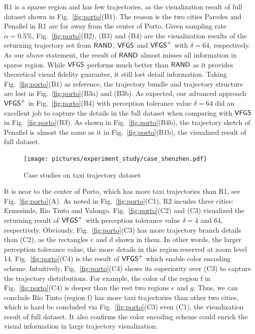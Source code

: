 R1 is a sparse region and has few trajectories, as the visualization result of full \pt{} dataset shown in Fig.~\ref{fig:porto}(B1).
The reason is the two cities Paredes and Penafiel in R1 are far away from the center of Porto.
Given sampling rate $\alpha=0.5\%$, Fig.~\ref{fig:porto}(B2), (B3) and (B4) are the visualization results of the returning trajectory set from $\mathsf{RAND}{}$, $\mathsf{VFGS}$ and $\mathsf{VFGS}^{+}$ with $\delta=64$, respectively.
As our above statement, the result of $\mathsf{RAND}$ almost misses all information in sparse region.
While $\mathsf{VFGS}$ performs much better than $\mathsf{RAND}$ as it provides theoretical visual fidelity guarantee, it still lost detail information.
Taking Fig.~\ref{fig:porto}(B1) as reference, the trajectory bundle and trajectory structure are lost in Fig.~\ref{fig:porto}(B3a) and (B3b).
As expected, our advanced approach $\mathsf{VFGS}^{+}$ in Fig.~\ref{fig:porto}(B4) with perception tolerance value $\delta=64$ did an excellent job to capture the details in the full dataset when comparing with $\mathsf{VFGS}$ in Fig.~\ref{fig:porto}(B3).
As shown in Fig.~\ref{fig:porto}(B4b), the trajectory sketch of Penafiel is almost the same as it in Fig.~\ref{fig:porto}(B1b), the visualized result of full dataset.


\begin{figure}[t]
	\centering
	\texttt{[image: pictures/experiment\_study/case\_shenzhen.pdf]}
	\vspace{-4mm}
	\caption{Case studies on \sz{} taxi trajectory dataset}
	\label{fig:shenzhen}
    \vspace{-3mm}
\end{figure}

 It is near to the center of Porto, which has more taxi trajectories than R1, see Fig.~\ref{fig:porto}(A).
As noted in Fig.~\ref{fig:porto}(C1), R2 incudes three cities: Ermesinde, Rio Tinto and Valongo.
Fig.~\ref{fig:porto}(C2) and (C3) visualized the returning result of $\mathsf{VFGS}^{+}$ with perception tolerance value $\delta=4$ and $64$, respectively.
Obviously, Fig.~\ref{fig:porto}(C3) has more trajectory branch details than (C2), as the rectangles c and d shown in them.
In other words, the larger perception tolerance value, the more details in this region reserved at zoom level 14.
Fig.~\ref{fig:porto}(C4) is the result of $\mathsf{VFGS}^{+}$ which enable color encoding scheme.
Intuitively, Fig.~\ref{fig:porto}(C4) shows its superiority over (C3) to capture the trajectory distributions.
For example, the color of the region f in Fig.~\ref{fig:porto}(C4) is deeper than the rest two regions $e$ and $g$.
Thus, we can conclude Rio Tinto (region f) has more taxi trajectories than other two cities, which is hard be concluded via Fig.~\ref{fig:porto}(C3) even (C1), the visualization result of full dataset.
It also confirms the color encoding scheme could enrich the visual information in large trajectory visualization.

